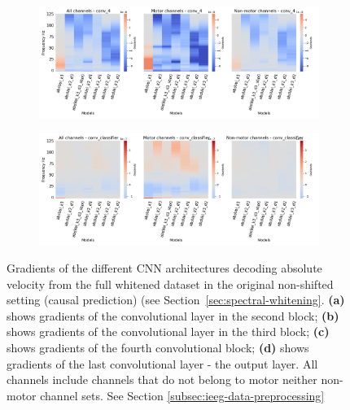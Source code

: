 \begin{figure}[!htbp]\ContinuedFloat

\begin{subfigure}[b]{\textwidth}
   \includegraphics[width=1\linewidth]{img/appendix/D/conv-4/m/absVel_model_gradients_all_kinds}
   \caption{}
   \label{fig:absVel-pw-full-grads-conv-4}
\end{subfigure}

\begin{subfigure}[b]{\textwidth}
   \includegraphics[width=1\linewidth]{img/appendix/D/conv-classifier/m/absVel_model_gradients_all_kinds}
   \caption{}
   \label{fig:absVel-pw-full-grads-conv-classifier}
\end{subfigure}

\caption[]{Gradients of the different CNN architectures decoding absolute velocity from the full whitened dataset in the original non-shifted setting (causal prediction) (see Section~\ref{sec:spectral-whitening}. \textbf{(a)} shows gradients of the convolutional layer in the second block; \textbf{(b)} shows gradients of the convolutional layer in the third block; \textbf{(c)} shows gradients of the fourth convolutional block; \textbf{(d)} shows gradients of the last convolutional layer - the output layer. All channels include channels that do not belong to motor neither non-motor channel sets. See Section \ref{subsec:ieeg-data-preprocessing}}
\label{fig:absVel-pw-full-grads}
\end{figure}

